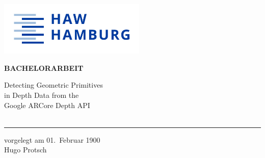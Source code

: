 \begin{titlepage}
  \color{haw}
  \raggedright
  \hfill\includegraphics[width=7cm]{images/HAW_Marke_RGB_300dpi}\\

  \vspace{5cm}

  \setmainfont{Open Sans}
  \small
  \textbf{BACHELORARBEIT}

  \vspace{8mm}

  \begin{minipage}{0.8\linewidth}
    \setmainfont{Martel Heavy}
    \LARGE

    Detecting Geometric Primitives\\[1mm]
    in Depth Data from the\\[1mm]
    Google ARCore Depth API\\[1mm]
    \,\rule{11mm}{1.2mm}
  \end{minipage}

  \vspace{1cm}

  vorgelegt am 01.\ Februar 1900\\
  Hugo Protsch

  \vspace{5cm}


\end{titlepage}
